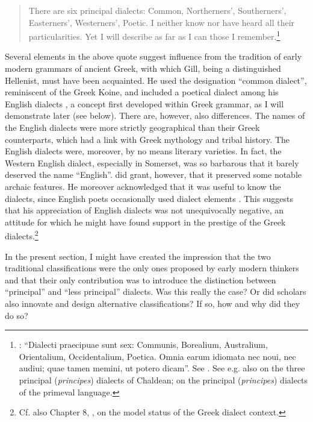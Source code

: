 {\begin{quote}
There are six principal dialects: Common, Northerners’, Southerners’, Easterners’, Westerners’, Poetic. I neither know nor have heard all their particularities. Yet I will describe as far as I can those I remember.\footnote{\citet[15]{Gill1619}: “Dialecti praecipuae sunt sex: Communis, Borealium, Australium, Orientalium, Occidentalium, Poetica. Omnia earum idiomata nec noui, nec audiui; quae tamen memini, ut potero dicam”. See \citet{Kokeritz1938}. See e.g. also \citet[liv]{Thomassin1697} on the three principal (\textit{principes}) dialects of Chaldean; \citet[\textsc{xciii}]{Schultens1748} on the principal (\textit{principes}) dialects of the primeval language.}
\end{quote}

Several elements in the above quote suggest influence from the tradition of early modern grammars of ancient Greek, with which Gill, being a distinguished Hellenist, must have been acquainted. He used the designation “common dialect”, reminiscent of the Greek Koine, and included a poetical dialect among his English dialects \citep[18]{Gill1619}, a concept first developed within Greek grammar, as I will demonstrate later (see  below). There are, however, also differences. The names of the English dialects were more strictly geographical than their Greek counterparts, which had a link with Greek mythology and tribal history. The English dialects were, moreover, by no means literary varieties. In fact, the Western English dialect, especially in Somerset, was so barbarous that it barely deserved the name “English”. \citet[17]{Gill1619} did grant, however, that it preserved some notable archaic features. He moreover acknowledged that it was useful to know the dialects, since English poets occasionally used dialect elements \citep[18]{Gill1619}. This suggests that his appreciation of English dialects was not unequivocally negative, an attitude for which he might have found support in the prestige of the Greek dialects.\footnote{Cf. also Chapter 8, , on the model status of the Greek dialect context.}

In the present section, I might have created the impression that the two traditional classifications were the only ones proposed by early modern thinkers and that their only contribution was to introduce the distinction between “principal” and “less principal” dialects. Was this really the case? Or did scholars also innovate and design alternative classifications? If so, how and why did they do so?

}
